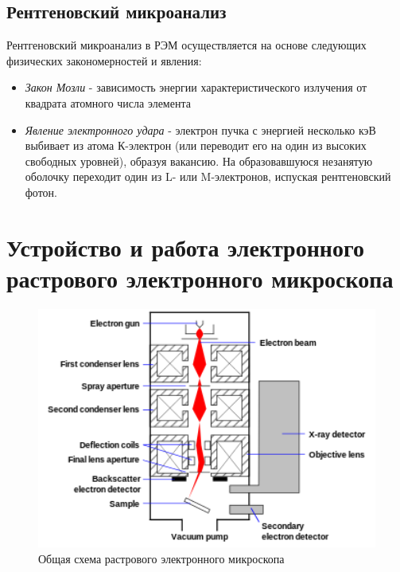 \documentclass[a4paper]{article}
\begin{document}
\subsection{Рентгеновский микроанализ}
Рентгеновский микроанализ в РЭМ осуществляется на основе следующих физических закономерностей и явления:
\begin{itemize}
    \item \textit{Закон Мозли} - зависимость энергии характеристического излучения от квадрата атомного числа элемента
    \item \textit{Явление электронного удара} - электрон пучка с энергией несколько кэВ выбивает из атома К-электрон (или переводит его на один из высоких свободных уровней), образуя вакансию. На образовавшуюся незанятую оболочку переходит один из L- или M-электронов, испуская рентгеновский фотон. 
\end{itemize}

\section{Устройство и работа электронного растрового электронного микроскопа}

\begin{figure}[h]
\begin{center}
\includegraphics[width=12cm]{Schema_MEB_(en).png}
\caption{Общая схема растрового электронного микроскопа}
\label{ris:experimoriginal} %
\end{center}
\end{figure}
\end{document}
